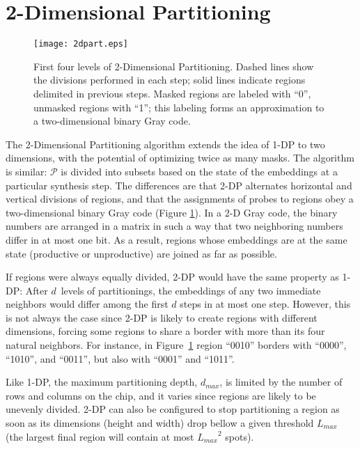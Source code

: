 \section{2-Dimensional Partitioning}
\label{sec:part_2d}

\begin{figure}[t]\centering
\texttt{[image: 2dpart.eps]}
\caption{\label{fig:2dpart}%
  First four levels of 2-Dimensional Partitioning. Dashed lines show the
  divisions performed in each step; solid lines indicate regions delimited in
  previous steps. Masked regions are labeled with ``0'', unmasked regions with
  ``1''; this labeling forms an approximation to a two-dimensional binary Gray
  code.}%
\end{figure}

The 2-Dimensional Partitioning algorithm \citep{Carvalho2007} extends the idea of
1-DP to two dimensions, with the potential of optimizing twice as many masks.
The algorithm is similar: $\mathcal{P}$ is divided into subsets based on the
state of the embeddings at a particular synthesis step. The differences are that
2-DP alternates horizontal and vertical divisions of regions, and that the
assignments of probes to regions obey a two-dimensional binary Gray code (Figure
\ref{fig:2dpart}). In a 2-D Gray code, the binary numbers are arranged in a
matrix in such a way that two neighboring numbers differ in at most one bit. As
a result, regions whose embeddings are at the same state (productive or
unproductive) are joined as far as possible.

If regions were always equally divided, 2-DP would have the same property as 1-
DP: After $d$~levels of partitionings, the
embeddings of any two immediate neighbors would differ among the first $d$ steps
in at most one step. However, this is not always the case since 2-DP is likely
to create regions with different dimensions, forcing some regions to share a
border with more than its four natural neighbors. For instance, in
Figure~\ref{fig:2dpart} region ``0010'' borders with ``0000'', ``1010'', and
``0011'', but also with ``0001'' and ``1011''.

Like 1-DP, the maximum partitioning depth, $d_{max}$, is limited by the number
of rows and columns on the chip, and it varies since regions are likely to be
unevenly divided. 2-DP can also be configured to stop partitioning a region as
soon as its dimensions (height and width) drop bellow a given threshold
$L_{max}$ (the largest final region will contain at most ${L_{max}}^2$ spots).

